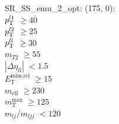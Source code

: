 SR\_SS\_emu\_2\_opt: (175, 0): \\
$p_{\text{T}}^{l1}$ $\geq 40$ \\
$p_{\text{T}}^{l2}$ $\geq 25$ \\
$p_{\text{T}}^{ll}$ $\geq 30$ \\
$m_{T2}$ $\geq 55$ \\
$|\Delta\eta_{ll}|$ $<1.5$ \\
$E_{\text{T}}^{\text{miss,rel}}$ $\geq 15$ \\
$m_{\text{eff}}$ $\geq 230$ \\
$m_{\text{T}}^{\text{max}}$ $\geq 125$ \\
$m_{lj}$/$m_{ljj}$ $<120$ \\
